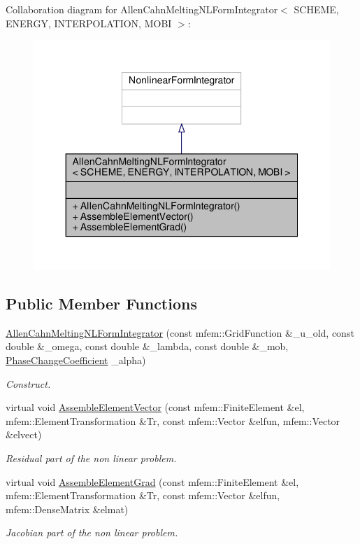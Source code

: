 Collaboration diagram for Allen\+Cahn\+Melting\+N\+L\+Form\+Integrator$<$ S\+C\+H\+E\+ME, E\+N\+E\+R\+GY, I\+N\+T\+E\+R\+P\+O\+L\+A\+T\+I\+ON, M\+O\+BI $>$\+:\nopagebreak
\begin{figure}[H]
\begin{center}
\leavevmode
\includegraphics[width=350pt]{classAllenCahnMeltingNLFormIntegrator__coll__graph}
\end{center}
\end{figure}
\subsection*{Public Member Functions}
\begin{DoxyCompactItemize}
\item 
\hyperlink{classAllenCahnMeltingNLFormIntegrator_a56ffb7b7b6963cf1cf8060e82361d861}{Allen\+Cahn\+Melting\+N\+L\+Form\+Integrator} (const mfem\+::\+Grid\+Function \&\+\_\+u\+\_\+old, const double \&\+\_\+omega, const double \&\+\_\+lambda, const double \&\+\_\+mob, \hyperlink{classPhaseChangeCoefficient}{Phase\+Change\+Coefficient} \+\_\+alpha)
\begin{DoxyCompactList}\small\item\em Construct. \end{DoxyCompactList}\item 
virtual void \hyperlink{classAllenCahnMeltingNLFormIntegrator_ab8e7696b5052bda3c43f95f67f0b798f}{Assemble\+Element\+Vector} (const mfem\+::\+Finite\+Element \&el, mfem\+::\+Element\+Transformation \&Tr, const mfem\+::\+Vector \&elfun, mfem\+::\+Vector \&elvect)
\begin{DoxyCompactList}\small\item\em Residual part of the non linear problem. \end{DoxyCompactList}\item 
virtual void \hyperlink{classAllenCahnMeltingNLFormIntegrator_a017da5aa8e63fb3d5c4ec65e721c957e}{Assemble\+Element\+Grad} (const mfem\+::\+Finite\+Element \&el, mfem\+::\+Element\+Transformation \&Tr, const mfem\+::\+Vector \&elfun, mfem\+::\+Dense\+Matrix \&elmat)
\begin{DoxyCompactList}\small\item\em Jacobian part of the non linear problem. \end{DoxyCompactList}\end{DoxyCompactItemize}


